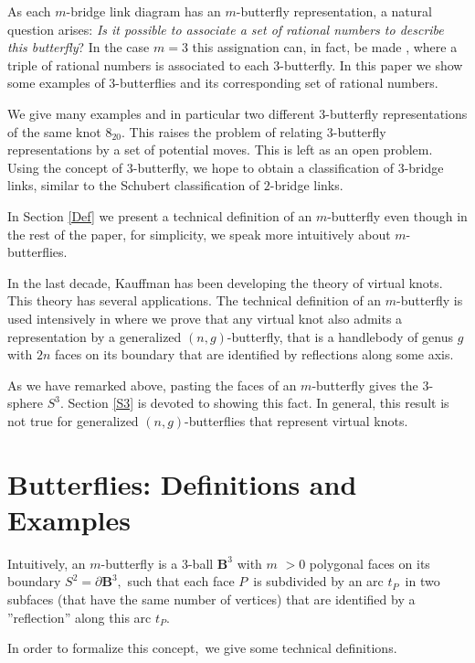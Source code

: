 \documentclass{amsproc}\usepackage{eurosym}
\theoremstyle{plain}
\numberwithin{equation}{section}
\begin{document}
As each $m$-bridge link diagram has an $m$-butterfly representation, a natural
question arises: \textit{Is it possible to associate a set of rational numbers
to describe this butterfly}? In the case $m=3$ this assignation can, in fact,
be made \cite{HMTT4}, where a triple of rational numbers is associated to each
3-butterfly. In this paper we show some examples of $3$-butterflies and its
corresponding set of rational numbers.

We give many examples and in particular two different $3$-butterfly
representations of the same knot $8_{20}.$ This raises the problem of relating
$3$-butterfly representations by a set of potential moves. This is left as an
open problem. Using the concept of $3$-butterfly, we hope to obtain a
classification of $3$-bridge links, similar to the Schubert classification of
$2$-bridge links.

In Section \ref{Def} we present a technical definition of an $m$-butterfly
even though in the rest of the paper, for simplicity, we speak more
intuitively about $m$-butterflies.

In the last decade, Kauffman \cite{Ka} has been developing the theory of
virtual knots. This theory has several applications. The technical definition
of an $m$-butterfly is used intensively in \cite{HMTT5} where we prove that
any virtual knot also admits a representation by a generalized $(n,g)$-butterfly, that is a handlebody of genus $g$ with $2n$ faces on its boundary
that are identified by reflections along some axis.

As we have remarked above, pasting the faces of an $m$-butterfly gives the $3
$-sphere $S^{3}$. Section \ref{S3} is devoted to showing this fact. In
general, this result is not true for generalized $(n,g)$-butterflies that
represent virtual knots.

\section{\label{Def}Butterflies: Definitions and Examples}

Intuitively, an $m$-butterfly is a $3$-ball $\mathbf{B}^{3}$ with $m$ $>0$
polygonal faces on its boundary $S^{2}=\partial\mathbf{B}^{3},$ such that each
face $P$\ is subdivided by an arc $t_{P}$\ in two subfaces (that have the same
number of vertices) that are identified by a ''reflection'' along this arc
$t_{P}.$

In order to formalize this concept,\ we give some technical definitions.
\end{document}
